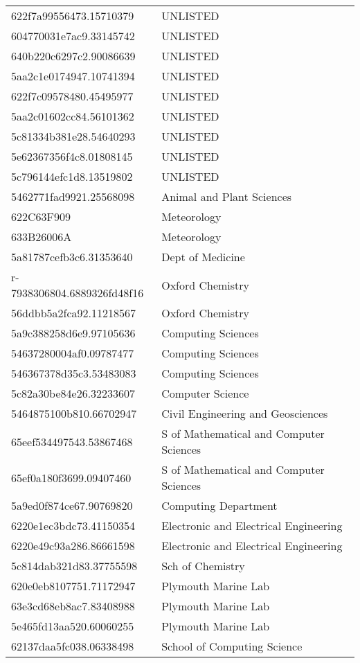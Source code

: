 \begin{tabular}{ll}
622f7a99556473.15710379 & UNLISTED \\
604770031e7ac9.33145742 & UNLISTED \\
640b220c6297c2.90086639 & UNLISTED \\
5aa2c1e0174947.10741394 & UNLISTED \\
622f7c09578480.45495977 & UNLISTED \\
5aa2c01602cc84.56101362 & UNLISTED \\
5c81334b381e28.54640293 & UNLISTED \\
5e62367356f4c8.01808145 & UNLISTED \\
5c796144efc1d8.13519802 & UNLISTED \\
5462771fad9921.25568098 & Animal and Plant Sciences \\
622C63F909 & Meteorology \\
633B26006A & Meteorology \\
5a81787cefb3c6.31353640 & Dept of Medicine \\
r-7938306804.6889326fd48f16 & Oxford Chemistry \\
56ddbb5a2fca92.11218567 & Oxford Chemistry \\
5a9c388258d6e9.97105636 & Computing Sciences \\
54637280004af0.09787477 & Computing Sciences \\
546367378d35c3.53483083 & Computing Sciences \\
5c82a30be84e26.32233607 & Computer Science \\
5464875100b810.66702947 & Civil Engineering and Geosciences \\
65eef534497543.53867468 & S of Mathematical and Computer Sciences \\
65ef0a180f3699.09407460 & S of Mathematical and Computer Sciences \\
5a9ed0f874ce67.90769820 & Computing Department \\
6220e1ec3bdc73.41150354 & Electronic and Electrical Engineering \\
6220e49c93a286.86661598 & Electronic and Electrical Engineering \\
5c814dab321d83.37755598 & Sch of Chemistry \\
620e0eb8107751.71172947 & Plymouth Marine Lab \\
63e3cd68eb8ac7.83408988 & Plymouth Marine Lab \\
5e465fd13aa520.60060255 & Plymouth Marine Lab \\
62137daa5fc038.06338498 & School of Computing Science \\

\end{tabular}
